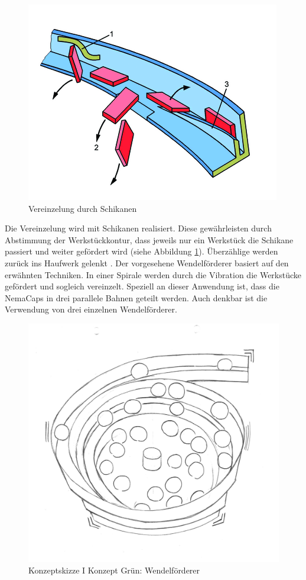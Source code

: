 \begin{figure}
	\includegraphics[scale=2.0]{Illustrationen/5-Konzept/schikane.png}
	\caption{Vereinzelung durch Schikanen \protect\cite{handling_online}}
	\label{fig:schikane}
\end{figure}


Die Vereinzelung wird mit Schikanen realisiert. Diese gewährleisten durch Abstimmung der Werkstückkontur, dass jeweils nur ein Werkstück die Schikane passiert und weiter gefördert wird (siehe Abbildung \ref{fig:schikane}). Überzählige werden zurück ins Haufwerk gelenkt \cite{handling_online}.
\newline
Der vorgesehene Wendelförderer basiert auf den erwähnten Techniken. In einer Spirale werden durch die Vibration die Werkstücke gefördert und sogleich vereinzelt. Speziell an dieser Anwendung ist, dass die NemaCaps in drei parallele Bahnen geteilt werden. Auch denkbar ist die Verwendung von drei einzelnen Wendelförderer.
\newline
\begin{figure}[H]
	\includegraphics[scale=0.6]{Illustrationen/5-Konzept/green_wendelfoerderer.jpg}
	\caption{Konzeptskizze I Konzept Grün: Wendelförderer}
	\label{fig:vereinzelung_green}
\end{figure}

